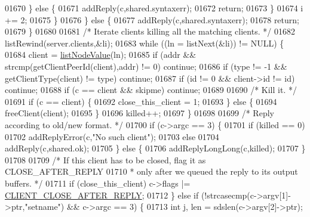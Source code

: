 \begin{DoxyCode}
{{{{{{{{{{{{{{{{{{{{01670                 \} \textcolor{keywordflow}{else} \{
01671                     addReply(c,shared.syntaxerr);
01672                     \textcolor{keywordflow}{return};
01673                 \}
01674                 i += 2;
01675             \}
01676         \} \textcolor{keywordflow}{else} \{
01677             addReply(c,shared.syntaxerr);
01678             \textcolor{keywordflow}{return};
01679         \}
01680 
01681         \textcolor{comment}{/* Iterate clients killing all the matching clients. */}
01682         listRewind(server.clients,&li);
01683         \textcolor{keywordflow}{while} ((ln = listNext(&li)) != NULL) \{
01684             client = \hyperlink{adlist_8h_af84cae230e7180ebcda1e2736fce9f65}{listNodeValue}(ln);
01685             \textcolor{keywordflow}{if} (addr && strcmp(getClientPeerId(client),addr) != 0) \textcolor{keywordflow}{continue};
01686             \textcolor{keywordflow}{if} (type != -1 && getClientType(client) != type) \textcolor{keywordflow}{continue};
01687             \textcolor{keywordflow}{if} (id != 0 && client->id != id) \textcolor{keywordflow}{continue};
01688             \textcolor{keywordflow}{if} (c == client && skipme) \textcolor{keywordflow}{continue};
01689 
01690             \textcolor{comment}{/* Kill it. */}
01691             \textcolor{keywordflow}{if} (c == client) \{
01692                 close\_this\_client = 1;
01693             \} \textcolor{keywordflow}{else} \{
01694                 freeClient(client);
01695             \}
01696             killed++;
01697         \}
01698 
01699         \textcolor{comment}{/* Reply according to old/new format. */}
01700         \textcolor{keywordflow}{if} (c->argc == 3) \{
01701             \textcolor{keywordflow}{if} (killed == 0)
01702                 addReplyError(c,\textcolor{stringliteral}{"No such client"});
01703             \textcolor{keywordflow}{else}
01704                 addReply(c,shared.ok);
01705         \} \textcolor{keywordflow}{else} \{
01706             addReplyLongLong(c,killed);
01707         \}
01708 
01709         \textcolor{comment}{/* If this client has to be closed, flag it as CLOSE\_AFTER\_REPLY}
01710 \textcolor{comment}{         * only after we queued the reply to its output buffers. */}
01711         \textcolor{keywordflow}{if} (close\_this\_client) c->flags |= \hyperlink{server_8h_a8cff2154afcc2e87ac85bdbbe2814091}{CLIENT\_CLOSE\_AFTER\_REPLY};
01712     \} \textcolor{keywordflow}{else} \textcolor{keywordflow}{if} (!strcasecmp(c->argv[1]->ptr,\textcolor{stringliteral}{"setname"}) && c->argc == 3) \{
01713         \textcolor{keywordtype}{int} j, len = sdslen(c->argv[2]->ptr);
}}}}}}}}}}}}}}}}}}}}
\end{DoxyCode}
